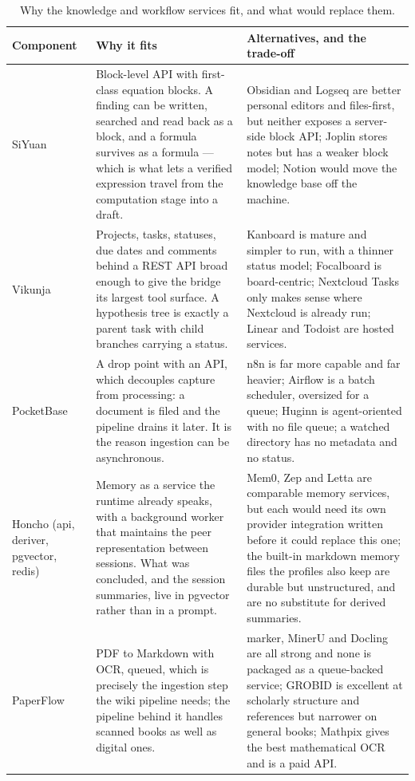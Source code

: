 \documentclass[10pt]{article}
\begin{document}
\begin{table}[htbp]
\centering\footnotesize
\caption{Why the knowledge and workflow services fit, and what would replace them.}\label{tab:whywrite}
\renewcommand{\arraystretch}{1.15}
\begin{tabularx}{\textwidth}{@{}>{\raggedright\arraybackslash}p{2.8cm} >{\raggedright\arraybackslash}X >{\raggedright\arraybackslash}X@{}}
\toprule
\textbf{Component} & \textbf{Why it fits} & \textbf{Alternatives, and the trade-off} \\
\midrule
SiYuan & Block-level API with first-class equation blocks. A finding can be written, searched and read back as a block, and a formula survives as a formula --- which is what lets a verified expression travel from the computation stage into a draft. & Obsidian and Logseq are better personal editors and files-first, but neither exposes a server-side block API; Joplin stores notes but has a weaker block model; Notion would move the knowledge base off the machine. \\
Vikunja & Projects, tasks, statuses, due dates and comments behind a REST API broad enough to give the bridge its largest tool surface. A hypothesis tree is exactly a parent task with child branches carrying a status. & Kanboard is mature and simpler to run, with a thinner status model; Focalboard is board-centric; Nextcloud Tasks only makes sense where Nextcloud is already run; Linear and Todoist are hosted services. \\
PocketBase & A drop point with an API, which decouples capture from processing: a document is filed and the pipeline drains it later. It is the reason ingestion can be asynchronous. & n8n is far more capable and far heavier; Airflow is a batch scheduler, oversized for a queue; Huginn is agent-oriented with no file queue; a watched directory has no metadata and no status. \\
Honcho (api, deriver, pgvector, redis) & Memory as a service the runtime already speaks, with a background worker that maintains the peer representation between sessions. What was concluded, and the session summaries, live in pgvector rather than in a prompt. & Mem0, Zep and Letta are comparable memory services, but each would need its own provider integration written before it could replace this one; the built-in markdown memory files the profiles also keep are durable but unstructured, and are no substitute for derived summaries. \\
PaperFlow & PDF to Markdown with OCR, queued, which is precisely the ingestion step the wiki pipeline needs; the pipeline behind it handles scanned books as well as digital ones. & marker, MinerU and Docling are all strong and none is packaged as a queue-backed service; GROBID is excellent at scholarly structure and references but narrower on general books; Mathpix gives the best mathematical OCR and is a paid API. \\
\bottomrule
\end{tabularx}
\end{table}
\end{document}
